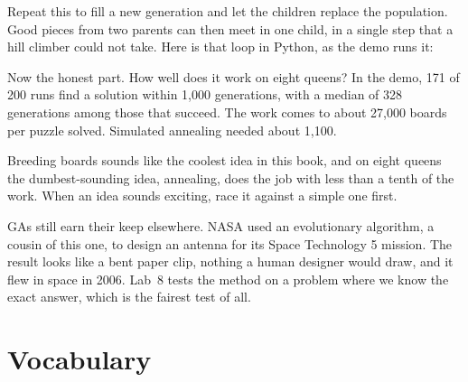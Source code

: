 Repeat this to fill a new generation and let the children replace the population. Good pieces from two parents can then meet in one child, in a single step that a hill climber could not take. Here is that loop in Python, as the demo runs it:



Now the honest part. How well does it work on eight queens? In the demo, 171 of 200 runs find a solution within 1,000 generations, with a median of 328 generations among those that succeed. The work comes to about 27,000 boards per puzzle solved. Simulated annealing needed about 1,100.

\begin{keyidea}
Breeding boards sounds like the coolest idea in this book, and on eight queens the dumbest-sounding idea, annealing, does the job with less than a tenth of the work. When an idea sounds exciting, race it against a simple one first.
\end{keyidea}

GAs still earn their keep elsewhere. NASA used an evolutionary algorithm, a cousin of this one, to design an antenna for its Space Technology 5 mission. The result looks like a bent paper clip, nothing a human designer would draw, and it flew in space in 2006. Lab~8 tests the method on a problem where we know the exact answer, which is the fairest test of all.

\section{Vocabulary}

